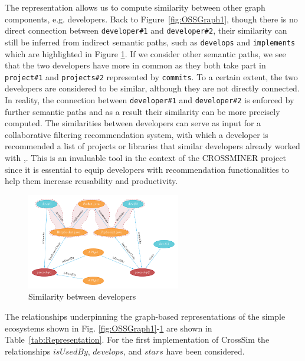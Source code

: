 The representation allows us to compute similarity between other graph components, e.g. developers. Back to Figure~\ref{fig:OSSGraph1}, though there is no direct connection between \texttt{developer\#1} and \texttt{developer\#2}, their similarity can still be inferred from indirect semantic paths, such as \texttt{develops} and \texttt{implements} which are highlighted in Figure \ref{fig:OSSGraph4}.
%
If we consider other semantic paths, we see that the two developers have more in common as they both take part in \texttt{project\#1} and \texttt{projects\#2} represented by \texttt{commits}. To a certain extent, the two developers are considered to be similar, although they are not directly connected. In reality, the connection between \texttt{developer\#1} and \texttt{developer\#2} is enforced by further semantic paths and as a result their similarity can be more precisely computed. The similarities between developers can serve as input for a collaborative filtering recommendation system, with which a developer is recommended a list of projects or libraries that similar developers already worked with \cite{Pazzani2007},\cite{Schafer:2007:CFR:1768197.1768208}. This is an invaluable tool in the context of the CROSSMINER project since it is essential to equip developers with recommendation functionalities to help them increase reusability and productivity.


\begin{figure}[t!]
	\centering
	\includegraphics[width=0.60\textwidth]{images/OSSGraph4.pdf}
	\caption{Similarity between developers}
	\label{fig:OSSGraph4}
\end{figure}

The relationships underpinning the graph-based representations of the simple ecosystems shown in Fig. \ref{fig:OSSGraph1}-\ref{fig:OSSGraph4} are shown in Table~\ref{tab:Representation}. For the first implementation of CrossSim the relationships $isUsedBy$, $develops$, and $stars$ have been considered. 
\clearpage


